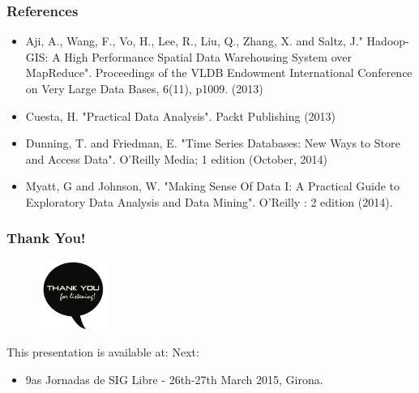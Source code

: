 \documentclass[hyperref={pdfpagelabels=true}]{beamer}
\begin{document}
\begin{frame}
\frametitle{References}
\begin{itemize}
\item Aji, A., Wang, F., Vo, H., Lee, R., Liu, Q., Zhang, X. and Saltz, J." Hadoop-GIS: A High Performance Spatial Data Warehousing System over MapReduce". Proceedings of the VLDB Endowment International Conference on Very Large Data Bases, 6(11), p1009. (2013)
\item Cuesta, H. "Practical Data Analysis". Packt Publishing (2013)
\item Dunning, T. and Friedman, E. "Time Series Databases: New Ways to Store and Access Data". O'Reilly Media; 1 edition (October, 2014)
\item Myatt, G and Johnson, W. "Making Sense Of Data I: A Practical Guide to Exploratory Data Analysis and Data Mining". O'Reilly : 2 edition (2014).
\end{itemize}
\end{frame}

\begin{frame}
\frametitle{Thank You!}
    \begin{figure}   
      \includegraphics[width=0.2\textwidth]{thanks.jpg}      
    \end{figure}   
    This presentation is available at: 
      \vspace{5mm}    
    Next:
    \begin{itemize}    
      \item<2-> 9as Jornadas de SIG Libre -  26th-27th March 2015, Girona.
     \end{itemize}
\end{frame}
\end{document}
